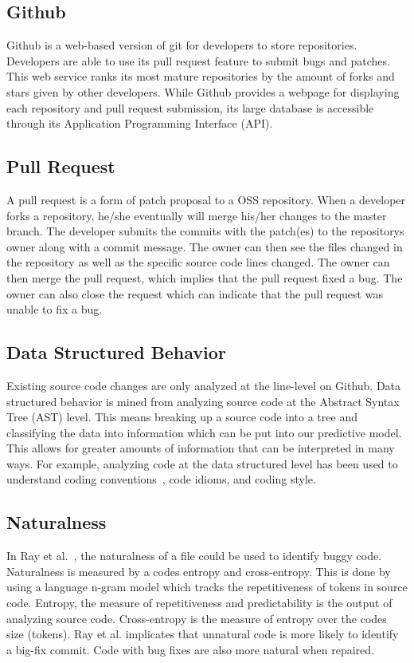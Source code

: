 \documentclass[10pt, conference]{IEEEtran}
\begin{document}
\subsection{Github}
Github is a web-based version of git for developers to store repositories. Developers are able to use its pull request feature to submit bugs and patches. This web service ranks its most mature repositories by the amount of forks and stars given by other developers. While Github provides a webpage for displaying each repository and pull request submission, its large database is accessible through its Application Programming Interface (API). 

\subsection{Pull Request}
A pull request is a form of patch proposal to a OSS repository. When a developer forks a repository, he/she eventually will merge his/her changes to the master branch. The developer submits the commits with the patch(es) to the repository\textquotesingle s owner along with a commit message. The owner can then see the files changed in the repository as well as the specific source code lines changed. The owner can then merge the pull request, which implies that the pull request fixed a bug. The owner can also close the request which can indicate that the pull request was unable to fix a bug.

\subsection{Data Structured Behavior}
Existing source code changes are only analyzed at the line-level on Github. Data structured behavior is mined from analyzing source code at the Abstract Syntax Tree (AST) level. This means breaking up a source code into a tree and classifying the data into information which can be put into our predictive model. This allows for greater amounts of information that can be interpreted in many ways. For example, analyzing code at the data structured level has been used to understand coding conventions~\cite{Allamanis:2014:LNC:2635868.2635883}, code idioms, and coding style.

\subsection{Naturalness}
In Ray et al.~\cite{Ray:2016:NBC:2884781.2884848}, the naturalness of a file could be used to identify buggy code. Naturalness is measured by a code\textquotesingle s entropy and cross-entropy. This is done by using a language n-gram model which tracks the repetitiveness of tokens in source code. Entropy, the measure of repetitiveness and predictability is the output of analyzing source code. Cross-entropy is the measure of entropy over the code\textquotesingle s size (tokens). Ray et al. implicates that unnatural code is more likely to identify a big-fix commit.  Code with bug fixes are also more natural when repaired.
\end{document}
